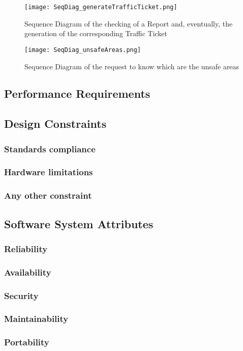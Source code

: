     \begin{figure}[h]
        \centering
        \texttt{[image: SeqDiag\_generateTrafficTicket.png]}
        \caption{Sequence Diagram of the checking of a Report and, eventually, the generation of the corresponding Traffic Ticket}
    \end{figure}
    
    \begin{figure}[h]
        \centering
        \texttt{[image: SeqDiag\_unsafeAreas.png]}
        \caption{Sequence Diagram of the request to know which are the unsafe areas}
   \end{figure}

\subsection{Performance Requirements}

\subsection{Design
Constraints}

\subsubsection{Standards compliance}

\subsubsection{Hardware
limitations}

\subsubsection{Any other constraint}

\subsection{Software System Attributes}

\subsubsection{Reliability}

\subsubsection{Availability}

\subsubsection{Security}

\subsubsection{Maintainability}

\subsubsection{Portability}